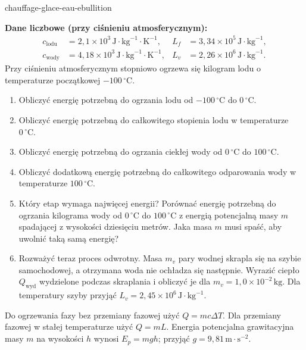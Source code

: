 
\begin{exo}{chauffage-glace-eau-ebullition}

\textbf{Dane liczbowe (przy ciśnieniu atmosferycznym):}
\[
\begin{aligned}
c_{\text{lodu}} &= 2{,}1\times10^3\,\text{J}\!\cdot\!\text{kg}^{-1}\!\cdot\!\text{K}^{-1},
& L_f &= 3{,}34\times10^5\,\text{J}\!\cdot\!\text{kg}^{-1},\\
c_{\text{wody}} &= 4{,}18\times10^3\,\text{J}\!\cdot\!\text{kg}^{-1}\!\cdot\!\text{K}^{-1},
& L_v &= 2{,}26\times10^6\,\text{J}\!\cdot\!\text{kg}^{-1}.
\end{aligned}
\]
Przy ciśnieniu atmosferycznym stopniowo ogrzewa się kilogram lodu o temperaturze początkowej $-100\,{}^\circ\text{C}$.

\begin{enumerate}
  \item Obliczyć energię potrzebną do ogrzania lodu od $-100\,{}^\circ\text{C}$ do $0\,{}^\circ\text{C}$.
  \item Obliczyć energię potrzebną do całkowitego stopienia lodu w temperaturze $0\,{}^\circ\text{C}$.
  \item Obliczyć energię potrzebną do ogrzania ciekłej wody od $0\,{}^\circ\text{C}$ do $100\,{}^\circ\text{C}$.
  \item Obliczyć dodatkową energię potrzebną do całkowitego odparowania wody w temperaturze $100\,{}^\circ\text{C}$.
  \item Który etap wymaga najwięcej energii? Porównać energię potrzebną do ogrzania kilograma wody od $0\,{}^\circ\text{C}$ do $100\,{}^\circ\text{C}$ z energią potencjalną masy $m$ spadającej z wysokości dziesięciu metrów. Jaka masa $m$ musi spaść, aby uwolnić taką samą energię?
  \item Rozważyć teraz proces odwrotny. Masa $m_v$ pary wodnej skrapla się na szybie samochodowej, a otrzymana woda nie ochładza się następnie. Wyrazić ciepło $Q_{\text{wyd}}$ wydzielone podczas skraplania i obliczyć je dla $m_v=1{,}0\times10^{-2}\,\text{kg}$. Dla temperatury szyby przyjąć $L_v=2{,}45\times10^6\,\text{J}\!\cdot\!\text{kg}^{-1}$.
\end{enumerate}

\begin{indication}
Do ogrzewania fazy bez przemiany fazowej użyć $Q=mc\Delta T$. Dla przemiany fazowej w stałej temperaturze użyć $Q=mL$. Energia potencjalna grawitacyjna masy $m$ na wysokości $h$ wynosi $E_p=mgh$; przyjąć $g=9{,}81\,\text{m}\!\cdot\!\text{s}^{-2}$.
\end{indication}


\end{exo}
